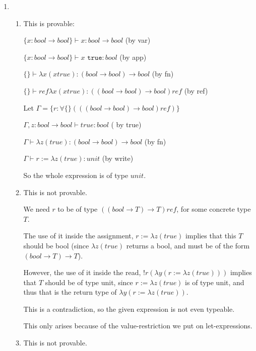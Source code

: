 \begin{enumerate}[label=(\alph*)]
    \item
        \begin{enumerate}[label=(\roman*)]
            \item
                This is provable:

                $\{x : bool \rightarrow bool\} \vdash x : bool \rightarrow bool$ (by var)

                $\{x : bool \rightarrow bool\} \vdash x \texttt{ true} : bool$ (by app)

                $\{\} \vdash \lambda x (x true) : (bool \rightarrow bool) \rightarrow bool$ (by fn)

                $\{\} \vdash ref \lambda x (x true) : ((bool \rightarrow bool) \rightarrow bool)ref$ (by ref)

                Let $\Gamma= \{r : \forall \{\}(((bool \rightarrow bool) \rightarrow bool) ref)\}$

                $\Gamma, z : bool \rightarrow bool \vdash true : bool$ ( by true)

                $\Gamma \vdash \lambda z(true) : (bool \rightarrow bool) \rightarrow bool$ (by fn)

                $\Gamma \vdash r:= \lambda z(true) : unit$ (by write)

                So the whole expression is of type $unit$.

            \item
                This is not provable.

                We need $r$ to be of type $((bool \rightarrow T) \rightarrow T) ref$, for some concrete type $T$.

                The use of it inside the assignment, $r := \lambda z(true)$ implies that this $T$ should be bool (since $\lambda z(true)$ returns a bool, and must be of the form $(bool \rightarrow T) \rightarrow T$).

                However, the use of it inside the read, $!r (\lambda y(r := \lambda z(true)))$ implies that $T$ should be of type unit, since $r := \lambda z(true)$ is of type unit, and thus that is the return type of $\lambda y(r := \lambda z(true))$.

                This is a contradiction, so the given expression is not even typeable.

                This only arises because of the value-restriction we put on let-expressions.

            \item
                This is not provable.


\end{enumerate}
\end{enumerate}
